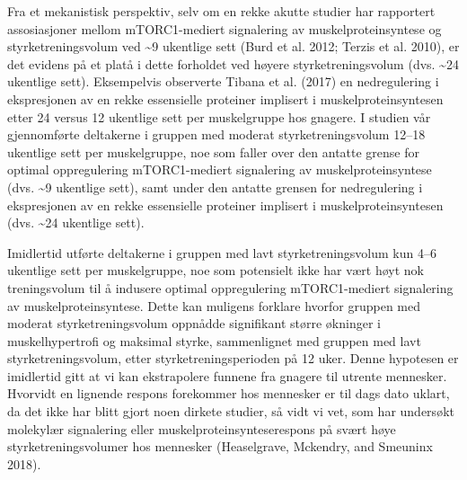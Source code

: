 \documentclass[
  letterpaper,
  DIV=11,
  numbers=noendperiod]{scrreprt}
\begin{document}
Fra et mekanistisk perspektiv, selv om en rekke akutte studier har
rapportert assosiasjoner mellom mTORC1-mediert signalering av
muskelproteinsyntese og styrketreningsvolum ved \textasciitilde9
ukentlige sett (Burd et al. 2012; Terzis et al. 2010), er det evidens på
et platå i dette forholdet ved høyere styrketreningsvolum (dvs.
\textasciitilde24 ukentlige sett). Eksempelvis observerte Tibana et al.
(2017) en nedregulering i ekspresjonen av en rekke essensielle proteiner
implisert i muskelproteinsyntesen etter 24 versus 12 ukentlige sett per
muskelgruppe hos gnagere. I studien vår gjennomførte deltakerne i
gruppen med moderat styrketreningsvolum 12--18 ukentlige sett per
muskelgruppe, noe som faller over den antatte grense for optimal
oppregulering mTORC1-mediert signalering av muskelproteinsyntese (dvs.
\textasciitilde9 ukentlige sett), samt under den antatte grensen for
nedregulering i ekspresjonen av en rekke essensielle proteiner implisert
i muskelproteinsyntesen (dvs. \textasciitilde24 ukentlige sett).

Imidlertid utførte deltakerne i gruppen med lavt styrketreningsvolum kun
4--6 ukentlige sett per muskelgruppe, noe som potensielt ikke har vært
høyt nok treningsvolum til å indusere optimal oppregulering
mTORC1-mediert signalering av muskelproteinsyntese. Dette kan muligens
forklare hvorfor gruppen med moderat styrketreningsvolum oppnådde
signifikant større økninger i muskelhypertrofi og maksimal styrke,
sammenlignet med gruppen med lavt styrketreningsvolum, etter
styrketreningsperioden på 12 uker. Denne hypotesen er imidlertid gitt at
vi kan ekstrapolere funnene fra gnagere til utrente mennesker. Hvorvidt
en lignende respons forekommer hos mennesker er til dags dato uklart, da
det ikke har blitt gjort noen dirkete studier, så vidt vi vet, som har
undersøkt molekylær signalering eller muskelproteinsynteserespons på
svært høye styrketreningsvolumer hos mennesker (Heaselgrave, Mckendry,
and Smeuninx 2018).
\end{document}

